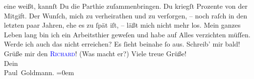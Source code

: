                eine weißt, kannſt Du die Parthie zuſammenbringen. Du kriegſt Prozente von der
               Mitgift.\pend
           \pstart
           Der Wunſch, mich zu verheirathen und zu verſorgen, – noch raſch in den letzten paar
               Jahren, ehe es zu ſpät iſt, – läßt mich nicht mehr los. Mein ganzes Leben lang bin
               ich ein Arbeitsthier geweſen und habe auf Alles verzichten müſſen. Werde ich auch das
               nicht erreichen? Es ſieht {\pb}beinahe ſo aus.\pend
           \pstart
           Schreib’ mir bald!\pend
           \pstart
           Grüße mir den \textsc{\textcolor{blue}{Richard}{}\ledrightnote{\textcolor{blue}{Richard Beer-Hofmann}}}! (Was macht er?)\pend
           \pstart
           Viele treue Grüße! {\\[\baselineskip]}Dein {\\[\baselineskip]}\spacefill\mbox{Paul Goldmann.}\pend
           \leftskip=0em{}\endnumbering{}  
      